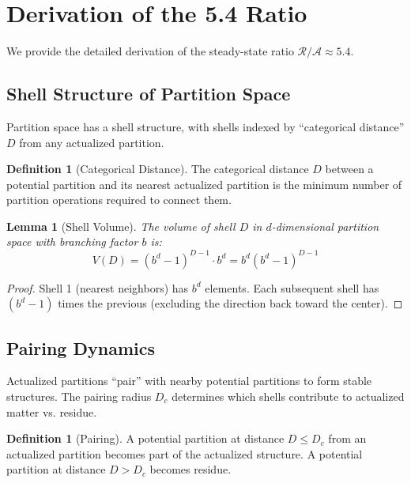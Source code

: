 \documentclass[twocolumn,10pt,a4paper]{article}
\newtheorem{lemma}[theorem]{Lemma}
\theoremstyle{definition}
\newtheorem{definition}[theorem]{Definition}
\theoremstyle{remark}
\newcommand{\Residue}{\mathcal{R}}
\begin{document}
\appendix

\section{Derivation of the 5.4 Ratio}
\label{app:ratio}

We provide the detailed derivation of the steady-state ratio $\Residue/\mathcal{A} \approx 5.4$.

\subsection{Shell Structure of Partition Space}

Partition space has a shell structure, with shells indexed by ``categorical distance'' $D$ from any actualized partition.

\begin{definition}[Categorical Distance]
The categorical distance $D$ between a potential partition and its nearest actualized partition is the minimum number of partition operations required to connect them.
\end{definition}

\begin{lemma}[Shell Volume]
The volume of shell $D$ in $d$-dimensional partition space with branching factor $b$ is:
\begin{equation}
    V(D) = (b^d - 1)^{D-1} \cdot b^d = b^d (b^d - 1)^{D-1}
\end{equation}
\end{lemma}

\begin{proof}
Shell 1 (nearest neighbors) has $b^d$ elements. Each subsequent shell has $(b^d - 1)$ times the previous (excluding the direction back toward the center).
\end{proof}

\subsection{Pairing Dynamics}

Actualized partitions ``pair'' with nearby potential partitions to form stable structures. The pairing radius $D_c$ determines which shells contribute to actualized matter vs. residue.

\begin{definition}[Pairing]
A potential partition at distance $D \leq D_c$ from an actualized partition becomes part of the actualized structure. A potential partition at distance $D > D_c$ becomes residue.
\end{definition}
\end{document}
